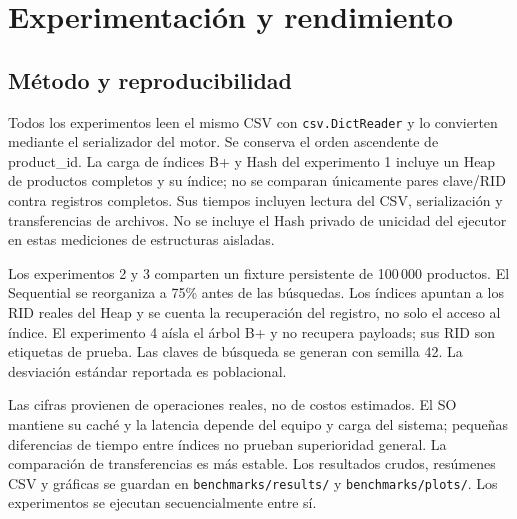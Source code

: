 \section{Experimentación y rendimiento}
\subsection{Método y reproducibilidad}
Todos los experimentos leen el mismo CSV con \texttt{csv.DictReader} y lo convierten mediante el serializador del motor. Se conserva el orden ascendente de product\_id. La carga de índices B+ y Hash del experimento 1 incluye un Heap de productos completos y su índice; no se comparan únicamente pares clave/RID contra registros completos. Sus tiempos incluyen lectura del CSV, serialización y transferencias de archivos. No se incluye el Hash privado de unicidad del ejecutor en estas mediciones de estructuras aisladas.

Los experimentos 2 y 3 comparten un fixture persistente de 100\,000 productos. El Sequential se reorganiza a 75\% antes de las búsquedas. Los índices apuntan a los RID reales del Heap y se cuenta la recuperación del registro, no solo el acceso al índice. El experimento 4 aísla el árbol B+ y no recupera payloads; sus RID son etiquetas de prueba. Las claves de búsqueda se generan con semilla 42. La desviación estándar reportada es poblacional.

Las cifras provienen de operaciones reales, no de costos estimados. El SO mantiene su caché y la latencia depende del equipo y carga del sistema; pequeñas diferencias de tiempo entre índices no prueban superioridad general. La comparación de transferencias es más estable. Los resultados crudos, resúmenes CSV y gráficas se guardan en \texttt{benchmarks/results/} y \texttt{benchmarks/plots/}. Los experimentos se ejecutan secuencialmente entre sí.


